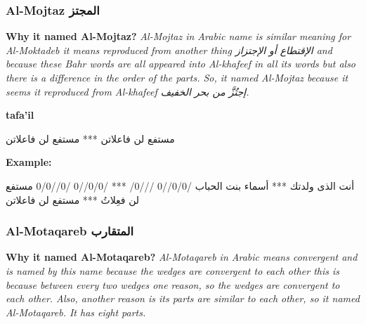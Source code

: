       

\subsubsection{Al-Mojtaz \textarabic{المجتز}}
\textbf{Why it named Al-Mojtaz?}
\textit{Al-Mojtaz in Arabic name is similar meaning for Al-Moktadeb it means reproduced from another thing \textarabic{الإقتطاع أو الإجتزاز} and because these Bahr words are all appeared into Al-khafeef in all its words but also there is a difference in the order of the parts. So, it named Al-Mojtaz because it seems it reproduced from Al-khafeef \textarabic{إجتُزَّ من بحر الخفيف}.}


\textbf{tafa'il}

\begin{Arabic}
  \begin{traditionalpoem*}

    مستفع لن فاعلاتن *** مستفع لن فاعلاتن 
    
	\end{traditionalpoem*}
      \end{Arabic}


\textbf{Example:}

\begin{Arabic}
  \begin{traditionalpoem*}


    أنت الذى ولدتك *** أسماء بنت الحباب
    /0/0//0  ///0/ *** /0/0//0  /0//0/0
    مستفع لن  فعِلاتُ *** مستفع لن فاعلاتن 
    
          
	\end{traditionalpoem*}
      \end{Arabic}

      \newpage
      

\subsubsection{Al-Motaqareb \textarabic{المتقارب}}
\textbf{Why it named Al-Motaqareb?}
\textit{Al-Motaqareb in Arabic means convergent and is named by this name because the wedges are convergent to each other this is because between every two wedges one reason, so the wedges are convergent to each other. Also, another reason is its parts are similar to each other, so it named Al-Motaqareb. It has eight parts.
}

